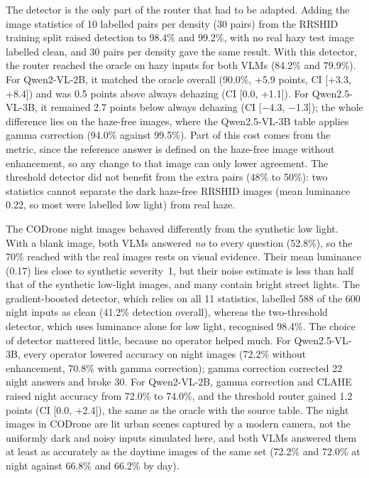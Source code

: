 \documentclass[lettersize,journal]{IEEEtran}
\begin{document}
The detector is the only part of the router that had to be adapted. Adding the image statistics of 10 labelled pairs per density (30 pairs) from the RRSHID training split raised detection to 98.4\% and 99.2\%, with no real hazy test image labelled clean, and 30 pairs per density gave the same result. With this detector, the router reached the oracle on hazy inputs for both VLMs (84.2\% and 79.9\%). For Qwen2-VL-2B, it matched the oracle overall (90.0\%, +5.9 points, CI [+3.3, +8.4]) and was 0.5 points above always dehazing (CI [0.0, +1.1]). For Qwen2.5-VL-3B, it remained 2.7 points below always dehazing (CI [$-$4.3, $-$1.3]); the whole difference lies on the haze-free images, where the Qwen2.5-VL-3B table applies gamma correction (94.0\% against 99.5\%). Part of this cost comes from the metric, since the reference answer is defined on the haze-free image without enhancement, so any change to that image can only lower agreement. The threshold detector did not benefit from the extra pairs (48\% to 50\%): two statistics cannot separate the dark haze-free RRSHID images (mean luminance 0.22, so most were labelled low light) from real haze.

The CODrone night images behaved differently from the synthetic low light. With a blank image, both VLMs answered \emph{no} to every question (52.8\%), so the 70\% reached with the real images rests on visual evidence. Their mean luminance (0.17) lies close to synthetic severity~1, but their noise estimate is less than half that of the synthetic low-light images, and many contain bright street lights. The gradient-boosted detector, which relies on all 11 statistics, labelled 588 of the 600 night inputs as clean (41.2\% detection overall), whereas the two-threshold detector, which uses luminance alone for low light, recognised 98.4\%. The choice of detector mattered little, because no operator helped much. For Qwen2.5-VL-3B, every operator lowered accuracy on night images (72.2\% without enhancement, 70.8\% with gamma correction); gamma correction corrected 22 night answers and broke 30. For Qwen2-VL-2B, gamma correction and CLAHE raised night accuracy from 72.0\% to 74.0\%, and the threshold router gained 1.2 points (CI [0.0, +2.4]), the same as the oracle with the source table. The night images in CODrone are lit urban scenes captured by a modern camera, not the uniformly dark and noisy inputs simulated here, and both VLMs answered them at least as accurately as the daytime images of the same set (72.2\% and 72.0\% at night against 66.8\% and 66.2\% by day).
\end{document}

